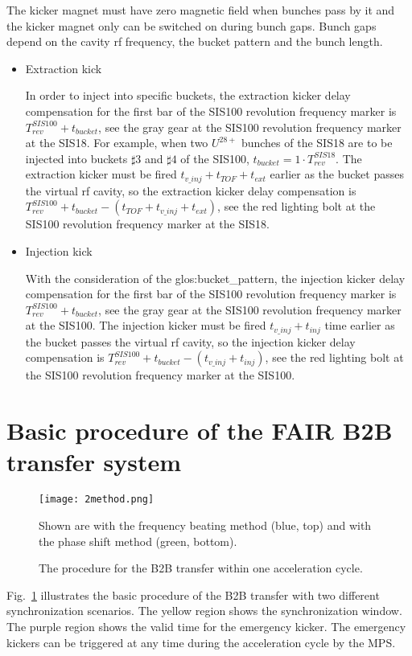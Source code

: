 The kicker magnet must have zero magnetic field when bunches pass by it and the kicker magnet only can be switched on during bunch gaps. Bunch gaps depend on the cavity rf frequency, the bucket pattern and the bunch length. 

\begin{itemize}
\item Extraction kick

In order to inject into specific buckets, the extraction kicker delay compensation for the first bar of the SIS100 revolution frequency marker is $T_{\mathit{rev}}^{\mathit{SIS100}} + t_{\mathit{bucket}}$, see the gray gear at the SIS100 revolution frequency marker at the SIS18. For example, when two $U^{28+}$ bunches of the SIS18 are to be injected into buckets $\sharp3$ and $\sharp4$ of the SIS100, $t_{\mathit{bucket}} =1 \cdot T_{\mathit{rev}}^{\mathit{SIS18}}$. The extraction kicker must be fired $t_{\mathit{v\_inj}}+t_{\mathit{TOF}}+t_{\mathit{ext}}$ earlier as the bucket passes the virtual rf cavity, so the extraction kicker delay compensation is $T_{\mathit{rev}}^{\mathit{SIS100}} + t_{\mathit{bucket}} - (t_{\mathit{TOF}} + t_{\mathit{v\_inj}} + t_{\mathit{ext}})$, see the red lighting bolt at the SIS100 revolution frequency marker at the SIS18. 

\item Injection kick

With the consideration of the \gls{glos:bucket_pattern}, the injection kicker delay compensation for the first bar of the SIS100 revolution frequency marker is $T_{\mathit{rev}}^{\mathit{SIS100}} + t_{\mathit{bucket}}$, see the gray gear at the SIS100 revolution frequency marker at the SIS100. The injection kicker must be fired $t_{\mathit{v\_inj}}+t_{\mathit{inj}}$ time earlier as the bucket passes the virtual rf cavity, so the injection kicker delay compensation is $T_{\mathit{rev}}^{\mathit{SIS100}} + t_{\mathit{bucket}} - (t_{\mathit{v\_inj}} + t_{\mathit{inj}})$, see the red lighting bolt at the SIS100 revolution frequency marker at the SIS100.
\end{itemize}

\section{Basic procedure of the FAIR B2B transfer system}
\begin{figure}[!htb]
   \centering   
   \texttt{[image: 2method.png]}
   \caption{The procedure for the B2B transfer within one acceleration cycle.}{Shown are with the frequency beating method (blue, top) and with the phase shift method (green, bottom).}
   \label{2method}
\end{figure}
Fig.~\ref{2method} illustrates the basic procedure of the B2B transfer with two different synchronization scenarios. The yellow region shows the synchronization window. The purple region shows the valid time for the emergency kicker. The emergency kickers can be triggered at any time during the acceleration cycle by the MPS.  


